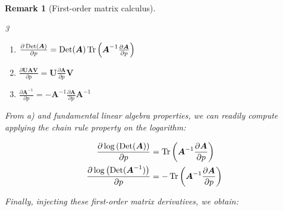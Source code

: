 \documentclass[pdflatex, sn-nature]{sn-jnl}
\theoremstyle{thmstyleone}%
\theoremstyle{thmstyletwo}%
\newtheorem{remark}{Remark}%
\theoremstyle{thmstylethree}%
\begin{document}
\begin{appendices}
\begin{remark}[First-order matrix calculus]
            \begin{multicols}{3}
                \begin{enumerate}[label=(\alph{*})]
                    \item $\frac{\partial \operatorname*{Det}(\boldsymbol{A})}{\partial p}=\operatorname*{Det}(
                        \boldsymbol{A}) \operatorname*{Tr} \left(\boldsymbol{A}^{-1}\frac{\partial
                        \boldsymbol{A}}{\partial p}\right)$

                    \item $\frac{\partial \boldsymbol{U}\boldsymbol{A}\boldsymbol{V}}{\partial
                        p}= \boldsymbol{U}\frac{\partial\boldsymbol{A}}{\partial
                        p}\boldsymbol{V}$

                    \item $\frac{\partial \boldsymbol{A}^{-1}}{\partial p}= -\boldsymbol
                        {A}^{-1}\frac{\partial\boldsymbol{A}}{\partial p}\boldsymbol
                        {A}^{-1}$
                \end{enumerate}
            \end{multicols}

            From a) and fundamental linear algebra properties, we can readily
            compute applying the chain rule property on the logarithm:

            \begin{equation*}
                \begin{split}
                    \frac{\partial \log\left(\operatorname*{Det}(\boldsymbol{A})\right)}{\partial
                    p}&= \operatorname*{Tr} \left(\boldsymbol{A}^{-1}\frac{\partial \boldsymbol{A}}{\partial
                    p}\right) \\
                    \frac{\partial \log\left(\operatorname*{Det}(\boldsymbol{A}^{-1})\right)}{\partial
                    p}&=- \operatorname*{Tr} \left(\boldsymbol{A}^{-1}\frac{\partial
                    \boldsymbol{A}}{\partial p}\right)
                \end{split}
            \end{equation*}

            Finally, injecting these first-order matrix derivatives, we obtain:


\end{remark}
\end{appendices}
\end{document}
